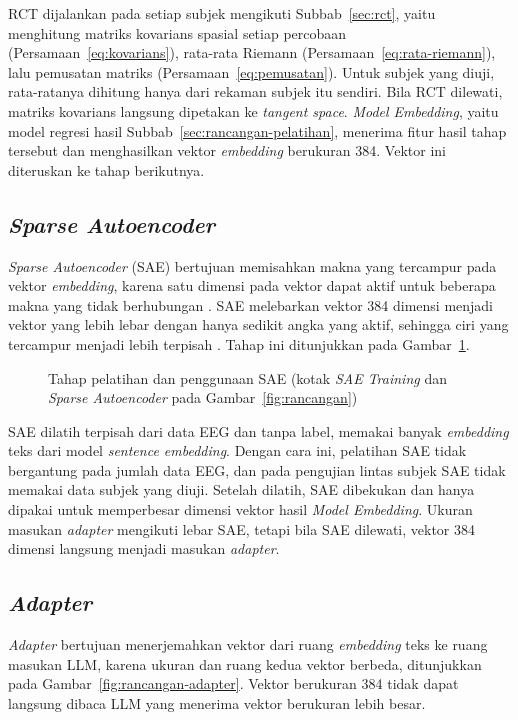 RCT dijalankan pada setiap subjek mengikuti Subbab~\ref{sec:rct}, yaitu menghitung matriks kovarians spasial setiap percobaan (Persamaan~\ref{eq:kovarians}), rata-rata Riemann (Persamaan~\ref{eq:rata-riemann}), lalu pemusatan matriks (Persamaan~\ref{eq:pemusatan}).
Untuk subjek yang diuji, rata-ratanya dihitung hanya dari rekaman subjek itu sendiri.
Bila RCT dilewati, matriks kovarians langsung dipetakan ke \textit{tangent space}.
\textit{Model Embedding}, yaitu model regresi hasil Subbab~\ref{sec:rancangan-pelatihan}, menerima fitur hasil tahap tersebut dan menghasilkan vektor \textit{embedding} berukuran 384.
Vektor ini diteruskan ke tahap berikutnya.

\subsection{\textit{Sparse Autoencoder}}
\label{sec:rancangan-sae}
\textit{Sparse Autoencoder} (SAE) bertujuan memisahkan makna yang tercampur pada vektor \textit{embedding}, karena satu dimensi pada vektor dapat aktif untuk beberapa makna yang tidak berhubungan \parencite{cunningham2023}.
SAE melebarkan vektor 384 dimensi menjadi vektor yang lebih lebar dengan hanya sedikit angka yang aktif, sehingga ciri yang tercampur menjadi lebih terpisah \parencite{bricken2023}.
Tahap ini ditunjukkan pada Gambar~\ref{fig:rancangan-sae}.

\begin{figure}[H]
  \centering
  
  \caption{Tahap pelatihan dan penggunaan SAE (kotak \textit{SAE Training} dan \textit{Sparse Autoencoder} pada Gambar~\ref{fig:rancangan})}
  \label{fig:rancangan-sae}
\end{figure}

SAE dilatih terpisah dari data EEG dan tanpa label, memakai banyak \textit{embedding} teks dari model \textit{sentence embedding}.
Dengan cara ini, pelatihan SAE tidak bergantung pada jumlah data EEG, dan pada pengujian lintas subjek SAE tidak memakai data subjek yang diuji.
Setelah dilatih, SAE dibekukan dan hanya dipakai untuk memperbesar dimensi vektor hasil \textit{Model Embedding}.
Ukuran masukan \textit{adapter} mengikuti lebar SAE, tetapi bila SAE dilewati, vektor 384 dimensi langsung menjadi masukan \textit{adapter}.

\subsection{\textit{Adapter}}
\label{sec:rancangan-adapter}
\textit{Adapter} bertujuan menerjemahkan vektor dari ruang \textit{embedding} teks ke ruang masukan LLM, karena ukuran dan ruang kedua vektor berbeda, ditunjukkan pada Gambar~\ref{fig:rancangan-adapter}.
Vektor berukuran 384 tidak dapat langsung dibaca LLM yang menerima vektor berukuran lebih besar.

